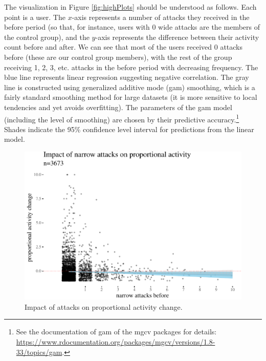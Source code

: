 \documentclass[a4paper,fleqn]{cas-dc}
\begin{document}
The visualization in Figure \ref{fig:highPlots} should be understood as follows. Each point is a user. The $x$-axis represents a number of attacks they received in the \textsf{before} period (so that, for instance, users with 0 wide attacks are the members of the control group), and  the $y$-axis represents the difference between their activity count \textsf{before} and \textsf{after}. We can see that most of the users received 0 attacks before (these are our control group members), with the rest of the group receiving 1, 2, 3, etc. attacks in the \textsf{before} period with decreasing frequency. The blue line represents linear regression suggesting negative correlation. The gray line is constructed using generalized additive mode (gam) smoothing, which is  a fairly standard smoothing method for large datasets (it is more sensitive to local tendencies and yet avoids overfitting). The parameters of the gam model (including the level of smoothing) are chosen by their predictive accuracy.\footnote{See  the documentation of \textsf{gam} of the \textsf{mgcv} packages for details: \url{https://www.rdocumentation.org/packages/mgcv/versions/1.8-33/topics/gam}.}  Shades indicate the 95\% confidence level interval for predictions from the linear model.






\begin{figure}[H]
\begin{center}\includegraphics[width=1\linewidth]{images/unnamed-chunk-6-1} 
\end{center}
\caption{Impact of attacks  on proportional activity change.}
\label{fig:propActivity}
\end{figure}
\end{document}

